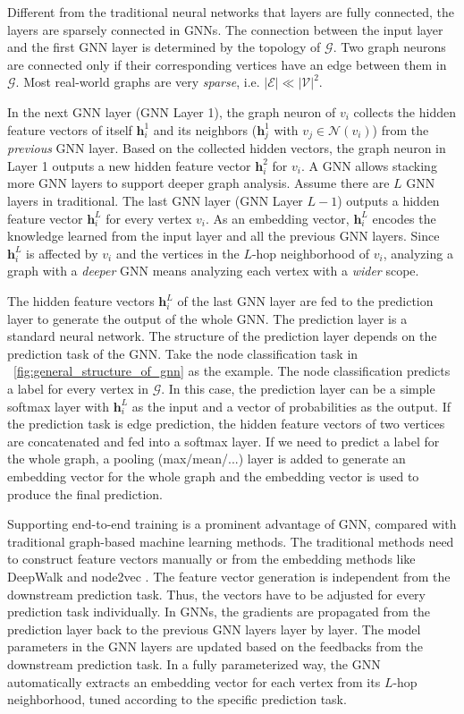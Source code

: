Different from the traditional neural networks that layers are fully connected, the layers are sparsely connected in GNNs. 
The connection between the input layer and the first GNN layer is determined by the topology of $\mathcal{G}$.
Two graph neurons are connected only if their corresponding vertices have an edge between them in $\mathcal{G}$.
Most real-world graphs are very \emph{sparse}, i.e. $|\mathcal{E}| \ll |\mathcal{V}|^2$.

In the next GNN layer (GNN Layer 1), the graph neuron of $v_i$ collects the hidden feature vectors of itself $\boldsymbol{h}^1_i$ and its neighbors ($\boldsymbol{h}^1_j$ with $v_j \in \mathcal{N}(v_i)$) from the \emph{previous} GNN layer.
Based on the collected hidden vectors, the graph neuron in Layer 1 outputs a new hidden feature vector $\boldsymbol{h}^2_i$ for $v_i$.
A GNN allows stacking more GNN layers to support deeper graph analysis.
Assume there are $L$ GNN layers in traditional.
The last GNN layer (GNN Layer $L-1$) outputs a hidden feature vector $\boldsymbol{h}^{L}_i$ for every vertex $v_i$.
As an embedding vector, $\boldsymbol{h}^L_i$ encodes the knowledge learned from the input layer and all the previous GNN layers.
Since $\boldsymbol{h}^L_i$ is affected by $v_i$ and the vertices in the $L$-hop neighborhood of $v_i$, analyzing a graph with a \emph{deeper} GNN means analyzing each vertex with a \emph{wider} scope.

The hidden feature vectors $\boldsymbol{h}^L_i$ of the last GNN layer are fed to the prediction layer to generate the output of the whole GNN.
The prediction layer is a standard neural network.
The structure of the prediction layer depends on the prediction task of the GNN.
Take the node classification task in \figurename~\ref{fig:general_structure_of_gnn} as the example.
The node classification predicts a label for every vertex in $\mathcal{G}$.
In this case, the prediction layer can be a simple softmax layer with $\boldsymbol{h}^L_i$ as the input and a vector of probabilities as the output.
If the prediction task is edge prediction, the hidden feature vectors of two vertices are concatenated and fed into a softmax layer.
If we need to predict a label for the whole graph, a pooling (max/mean/...) layer is added to generate an embedding vector for the whole graph and the embedding vector is used to produce the final prediction.

Supporting end-to-end training is a prominent advantage of GNN, compared with traditional graph-based machine learning methods.
The traditional methods need to construct feature vectors manually or from the embedding methods like DeepWalk \cite{bryan2014_deepwalk} and node2vec \cite{aditya2016_node2vec}.
The feature vector generation is independent from the downstream prediction task. 
Thus, the vectors have to be adjusted for every prediction task individually.
In GNNs, the gradients are propagated from the prediction layer back to the previous GNN layers layer by layer. 
The model parameters in the GNN layers are updated based on the feedbacks from the downstream prediction task. 
In a fully parameterized way, the GNN automatically extracts an embedding vector for each vertex from its $L$-hop neighborhood, tuned according to the specific prediction task.

